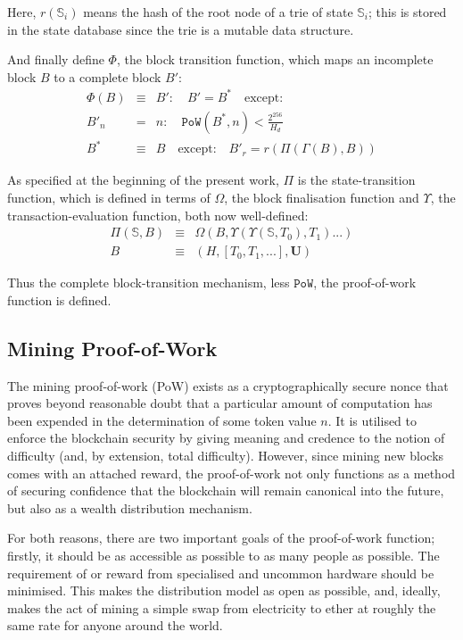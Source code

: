 \documentclass[9pt,oneside]{amsart}
\begin{document}
\begin{multicols}{2}
Here, $r(\mathbb{S}_i)$ means the hash of the root node of a trie of state $\mathbb{S}_i$; this is stored in the state database since the trie is a mutable data structure.

And finally define $\Phi$, the block transition function, which maps an incomplete block $B$ to a complete block $B'$:
\begin{eqnarray}
\Phi(B) & \equiv & B': \quad B' = B^* \quad \text{except:} \\
B'_n & = & n: \quad \mathtt{PoW}(B^*, n) < \frac{2^{256}}{H_d} \\
B^* & \equiv & B \quad \text{except:} \quad B'_r = r(\Pi(\Gamma(B), B))
\end{eqnarray}

As specified at the beginning of the present work, $\Pi$ is the state-transition function, which is defined in terms of $\Omega$, the block finalisation function and $\Upsilon$, the transaction-evaluation function, both now well-defined:
\begin{eqnarray}
\Pi(\mathbb{S}, B) & \equiv & \Omega(B, \Upsilon(\Upsilon(\mathbb{S}, T_0), T_1) ...) \\
B & \equiv & (H, [ T_0, T_1, ... ], \mathbf{U})
\end{eqnarray}

Thus the complete block-transition mechanism, less $\mathtt{PoW}$, the proof-of-work function is defined.

\subsection{Mining Proof-of-Work} \label{ch:pow}

The mining proof-of-work (PoW) exists as a cryptographically secure nonce that proves beyond reasonable doubt that a particular amount of computation has been expended in the determination of some token value $n$. It is utilised to enforce the blockchain security by giving meaning and credence to the notion of difficulty (and, by extension, total difficulty). However, since mining new blocks comes with an attached reward, the proof-of-work not only functions as a method of securing confidence that the blockchain will remain canonical into the future, but also as a wealth distribution mechanism.

For both reasons, there are two important goals of the proof-of-work function; firstly, it should be as accessible as possible to as many people as possible. The requirement of or reward from specialised and uncommon hardware should be minimised. This makes the distribution model as open as possible, and, ideally, makes the act of mining a simple swap from electricity to ether at roughly the same rate for anyone around the world.


\end{multicols}
\end{document}
